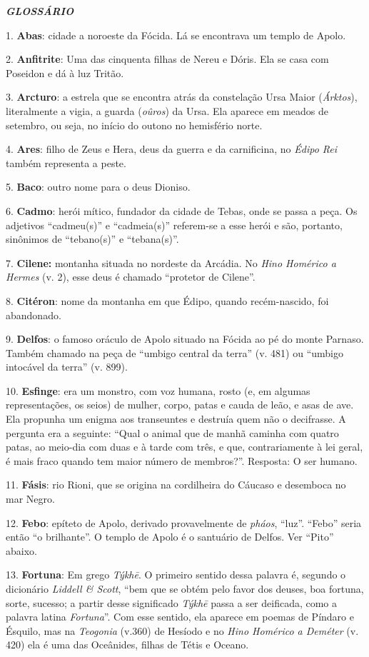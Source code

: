 \textbf{\emph{GLOSSÁRIO}}

1. \textbf{Abas}: cidade a noroeste da Fócida. Lá se encontrava um
templo de Apolo.

2. \textbf{Anfitrite}: Uma das cinquenta filhas de Nereu e Dóris. Ela se
casa com Poseidon e dá à luz Tritão.

3. \textbf{Arcturo}: a estrela que se encontra atrás da constelação Ursa
Maior (\emph{Árktos}), literalmente a vigia, a guarda (\emph{oûros}) da
Ursa. Ela aparece em meados de setembro, ou seja, no início do outono no
hemisfério norte.

4. \textbf{Ares}: filho de Zeus e Hera, deus da guerra e da carnificina,
no \emph{Édipo Rei} também representa a peste.

5. \textbf{Baco}: outro nome para o deus Dioniso.

6. \textbf{Cadmo}: herói mítico, fundador da cidade de Tebas, onde se
passa a peça. Os adjetivos ``cadmeu(s)'' e ``cadmeia(s)'' referem-se a
esse herói e são, portanto, sinônimos de ``tebano(s)'' e ``tebana(s)''.

7. \textbf{Cilene:} montanha situada no nordeste da Arcádia. No
\emph{Hino Homérico a Hermes} (v. 2), esse deus é chamado ``protetor de
Cilene''.

8. \textbf{Citéron}: nome da montanha em que Édipo, quando
recém-nascido, foi abandonado.

9. \textbf{Delfos}: o famoso oráculo de Apolo situado na Fócida ao pé do
monte Parnaso. Também chamado na peça de ``umbigo central da terra'' (v.
481) ou ``umbigo intocável da terra'' (v. 899).

10. \textbf{Esfinge}: era um monstro, com voz humana, rosto (e, em
algumas representações, os seios) de mulher, corpo, patas e cauda de
leão, e asas de ave. Ela propunha um enigma aos transeuntes e destruía
quem não o decifrasse. A pergunta era a seguinte: ``Qual o animal que de
manhã caminha com quatro patas, ao meio-dia com duas e à tarde com três,
e que, contrariamente à lei geral, é mais fraco quando tem maior número
de membros?''. Resposta: O ser humano.

11. \textbf{Fásis}: rio Rioni, que se origina na cordilheira do Cáucaso
e desemboca no mar Negro.

12. \textbf{Febo}: epíteto de Apolo, derivado provavelmente de
\emph{pháos}, ``luz''. ``Febo'' seria então ``o brilhante''. O templo de
Apolo é o santuário de Delfos. Ver ``Pito'' abaixo.

13. \textbf{Fortuna}: Em grego \emph{Týkhē}. O primeiro sentido dessa
palavra é, segundo o dicionário \emph{Liddell \& Scott}, ``bem que se
obtém pelo favor dos deuses, boa fortuna, sorte, sucesso; a partir desse
significado \emph{Týkhē} passa a ser deificada, como a palavra latina
\emph{Fortuna}''. Com esse sentido, ela aparece em poemas de Píndaro e
Ésquilo, mas na \emph{Teogonia} (v.360) de Hesíodo e no \emph{Hino
Homérico a Deméter} (v. 420) ela é uma das Oceânides, filhas de Tétis e
Oceano.


